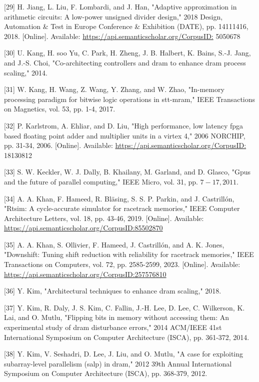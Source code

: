 \documentclass[10pt]{article}
\begin{document}
[29] H. Jiang, L. Liu, F. Lombardi, and J. Han, "Adaptive approximation in arithmetic circuits: A low-power unsigned divider design," 2018 Design, Automation \& Test in Europe Conference \& Exhibition (DATE), pp. 14111416, 2018. [Online]. Available: \href{https://api.semanticscholar.org/CorpusID:}{https://api.semanticscholar.org/CorpusID:} 5050678

[30] U. Kang, H. soo Yu, C. Park, H. Zheng, J. B. Halbert, K. Bains, S.-J. Jang, and J.-S. Choi, "Co-architecting controllers and dram to enhance dram process scaling," 2014.

[31] W. Kang, H. Wang, Z. Wang, Y. Zhang, and W. Zhao, "In-memory processing paradigm for bitwise logic operations in stt-mram," IEEE Transactions on Magnetics, vol. 53, pp. 1-4, 2017.

[32] P. Karlstrom, A. Ehliar, and D. Liu, "High performance, low latency fpga based floating point adder and multiplier units in a virtex 4," 2006 NORCHIP, pp. 31-34, 2006. [Online]. Available: \href{https://api.semanticscholar.org/CorpusID:}{https://api.semanticscholar.org/CorpusID:} 18130812

[33] S. W. Keckler, W. J. Dally, B. Khailany, M. Garland, and D. Glasco, "Gpus and the future of parallel computing," IEEE Micro, vol. 31, pp. $7-17,2011$.

[34] A. A. Khan, F. Hameed, R. Bläsing, S. S. P. Parkin, and J. Castrillón, "Rtsim: A cycle-accurate simulator for racetrack memories," IEEE Computer Architecture Letters, vol. 18, pp. 43-46, 2019. [Online]. Available: \href{https://api.semanticscholar.org/CorpusID:85502870}{https://api.semanticscholar.org/CorpusID:85502870}

[35] A. A. Khan, S. Ollivier, F. Hameed, J. Castrillón, and A. K. Jones, "Downshift: Tuning shift reduction with reliability for racetrack memories," IEEE Transactions on Computers, vol. 72, pp. 2585-2599, 2023. [Online]. Available: \href{https://api.semanticscholar.org/CorpusID:257576810}{https://api.semanticscholar.org/CorpusID:257576810}

[36] Y. Kim, "Architectural techniques to enhance dram scaling," 2018.

[37] Y. Kim, R. Daly, J. S. Kim, C. Fallin, J.-H. Lee, D. Lee, C. Wilkerson, K. Lai, and O. Mutlu, "Flipping bits in memory without accessing them: An experimental study of dram disturbance errors," 2014 ACM/IEEE 41st International Symposium on Computer Architecture (ISCA), pp. 361-372, 2014.

[38] Y. Kim, V. Seshadri, D. Lee, J. Liu, and O. Mutlu, "A case for exploiting subarray-level parallelism (salp) in dram," 2012 39th Annual International Symposium on Computer Architecture (ISCA), pp. 368-379, 2012.
\end{document}
